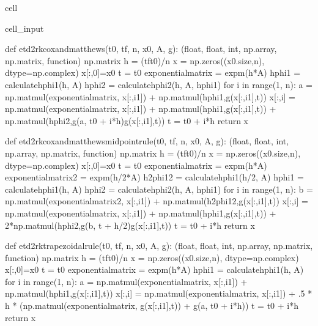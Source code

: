\documentclass[letterpaper,10pt,english]{jupyterBook}
\begin{document}
\begin{sphinxuseclass}{cell}
\begin{sphinxVerbatimInput}
\begin{sphinxuseclass}{cell_input}
\begin{sphinxVerbatim}[commandchars=\\\{\}]
def etd2rk\PYGZus{}cox\PYGZus{}and\PYGZus{}matthews(t0, tf, n, x0, A, g):
    \PYGZsq{}\PYGZsq{}\PYGZsq{}(float, float, int, np.array, np.matrix, function) \PYGZhy{}\PYGZgt{} np.matrix\PYGZsq{}\PYGZsq{}\PYGZsq{}
    h = (tf\PYGZhy{}t0)/n
    x = np.zeros((x0.size,n), dtype=np.complex\PYGZus{})
    x[:,0]=x0
    t = t0
    exponential\PYGZus{}matrix = expm(\PYGZhy{}h*A)
    hphi1 = calculate\PYGZus{}hphi1(h, A)
    hphi2 = calculate\PYGZus{}hphi2(h, A, hphi1)
    for i in range(1, n):
        a = np.matmul(exponential\PYGZus{}matrix, x[:,i\PYGZhy{}1]) + np.matmul(hphi1,g(x[:,i\PYGZhy{}1],t))
        x[:,i] = np.matmul(exponential\PYGZus{}matrix, x[:,i\PYGZhy{}1]) + np.matmul(hphi1,g(x[:,i\PYGZhy{}1],t)) + np.matmul(hphi2,g(a, t0 + i*h)\PYGZhy{}g(x[:,i\PYGZhy{}1],t))
        t = t0 + i*h
    return x

def etd2rk\PYGZus{}cox\PYGZus{}and\PYGZus{}matthews\PYGZus{}midpoint\PYGZus{}rule(t0, tf, n, x0, A, g):
    \PYGZsq{}\PYGZsq{}\PYGZsq{}(float, float, int, np.array, np.matrix, function) \PYGZhy{}\PYGZgt{} np.matrix\PYGZsq{}\PYGZsq{}\PYGZsq{}
    h = (tf\PYGZhy{}t0)/n
    x = np.zeros((x0.size,n), dtype=np.complex\PYGZus{})
    x[:,0]=x0
    t = t0
    exponential\PYGZus{}matrix = expm(\PYGZhy{}h*A)
    exponential\PYGZus{}matrix\PYGZus{}2 = expm(\PYGZhy{}h/2*A)
    h\PYGZus{}2phi1\PYGZus{}2 = calculate\PYGZus{}hphi1(h/2, A)
    hphi1 = calculate\PYGZus{}hphi1(h, A)
    hphi2 = calculate\PYGZus{}hphi2(h, A, hphi1)
    for i in range(1, n):
        b = np.matmul(exponential\PYGZus{}matrix\PYGZus{}2, x[:,i\PYGZhy{}1]) + np.matmul(h\PYGZus{}2phi1\PYGZus{}2,g(x[:,i\PYGZhy{}1],t))
        x[:,i] = np.matmul(exponential\PYGZus{}matrix, x[:,i\PYGZhy{}1]) + np.matmul(hphi1,g(x[:,i\PYGZhy{}1],t)) + 2*np.matmul(hphi2,g(b, t + h/2)\PYGZhy{}g(x[:,i\PYGZhy{}1],t))
        t = t0 + i*h
    return x

def etd2rk\PYGZus{}trapezoidal\PYGZus{}rule(t0, tf, n, x0, A, g):
    \PYGZsq{}\PYGZsq{}\PYGZsq{}(float, float, int, np.array, np.matrix, function) \PYGZhy{}\PYGZgt{} np.matrix\PYGZsq{}\PYGZsq{}\PYGZsq{}
    h = (tf\PYGZhy{}t0)/n
    x = np.zeros((x0.size,n), dtype=np.complex\PYGZus{})
    x[:,0]=x0
    t = t0
    exponential\PYGZus{}matrix = expm(\PYGZhy{}h*A)
    hphi1 = calculate\PYGZus{}hphi1(h, A)
    for i in range(1, n):
        a = np.matmul(exponential\PYGZus{}matrix, x[:,i\PYGZhy{}1]) + np.matmul(hphi1,g(x[:,i\PYGZhy{}1],t))
        x[:,i] = np.matmul(exponential\PYGZus{}matrix, x[:,i\PYGZhy{}1]) + .5 * h * (np.matmul(exponential\PYGZus{}matrix, g(x[:,i\PYGZhy{}1],t)) + g(a, t0 + i*h))
        t = t0 + i*h
    return x


\end{sphinxVerbatim}
\end{sphinxuseclass}
\end{sphinxVerbatimInput}
\end{sphinxuseclass}
\end{document}
